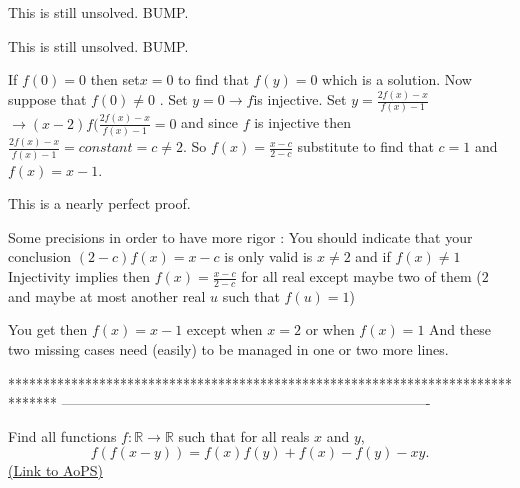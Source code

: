 \begin{solution}
	This is still unsolved. BUMP.
\end{solution}



\begin{solution}
	\begin{tcolorbox}This is still unsolved. BUMP.\end{tcolorbox}

If $f(0)=0$ then set$ x=0$ to find that $f(y)=0$ which is a solution.
Now suppose that $f(0)\neq 0$ .
Set $y=0 \rightarrow f $is injective.
Set $y=\frac{2f(x)-x}{f(x)-1} $
$\rightarrow (x-2)f(\frac{2f(x)-x}{f(x)-1}=0$
and since $f$ is injective then $\frac{2f(x)-x}{f(x)-1}=constant=c\neq 2$.
So $f(x)=\frac{x-c}{2-c}$ substitute to find that $c=1$ and $f(x)=x-1$.
\end{solution}



\begin{solution}
	This is a nearly perfect proof.

Some precisions in order to have more rigor :
You should indicate that your conclusion $(2-c)f(x)=x-c$ is only valid is $x\ne 2$ and if $f(x)\ne 1$
Injectivity implies then $f(x)=\frac{x-c}{2-c}$ for all real except maybe two of them ($2$ and maybe at most another real $u$ such that $f(u)=1$)

You get then $f(x)=x-1$ except when $x=2$ or when $f(x)=1$
And these two missing cases need (easily) to be managed in one or two more lines.
\end{solution}
*******************************************************************************
-------------------------------------------------------------------------------

\begin{problem}
	Find all functions $f: \mathbb R \to \mathbb R$ such that for all reals $x$ and $y$,
\[f(f(x - y)) = f(x)f(y) + f(x) - f(y) - xy.\]
	\flushright \href{https://artofproblemsolving.com/community/c6h414539}{(Link to AoPS)}
\end{problem}



